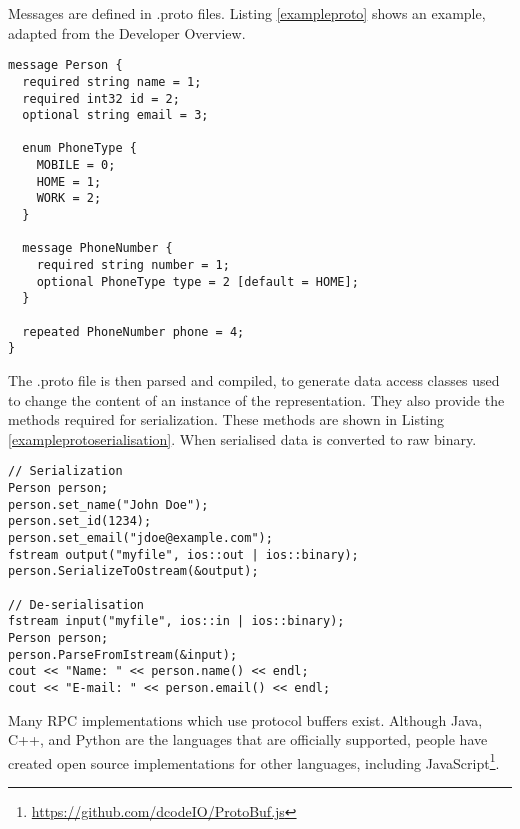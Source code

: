 \begin{description}
	Messages are defined in .proto files. Listing \ref{exampleproto} shows an example, adapted from the Developer Overview.
	~\\

	\begin{lstlisting}
message Person {
  required string name = 1;
  required int32 id = 2;
  optional string email = 3;

  enum PhoneType {
    MOBILE = 0;
    HOME = 1;
    WORK = 2;
  }

  message PhoneNumber {
    required string number = 1;
    optional PhoneType type = 2 [default = HOME];
  }

  repeated PhoneNumber phone = 4;
}
	\end{lstlisting}

	The .proto file is then parsed and compiled, to generate data access classes used to change the content of an instance of the representation. They also provide the methods required for serialization. These methods are shown in Listing \ref{exampleprotoserialisation}. When serialised data is converted to raw binary.

	\begin{lstlisting}
// Serialization
Person person;
person.set_name("John Doe");
person.set_id(1234);
person.set_email("jdoe@example.com");
fstream output("myfile", ios::out | ios::binary);
person.SerializeToOstream(&output);

// De-serialisation 
fstream input("myfile", ios::in | ios::binary);
Person person;
person.ParseFromIstream(&input);
cout << "Name: " << person.name() << endl;
cout << "E-mail: " << person.email() << endl;
	\end{lstlisting}


	Many RPC implementations which use protocol buffers exist. Although Java, C++, and Python are the languages that are officially supported, people have created open source  implementations for other languages, including JavaScript\footnote{\url{https://github.com/dcodeIO/ProtoBuf.js}}.
\end{description}

